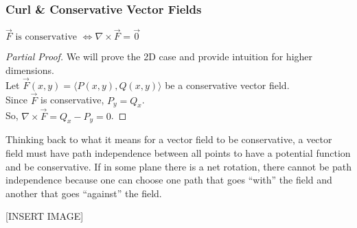 \subsubsection{Curl \& Conservative Vector Fields}
\begin{theorem}
	$\vec{F}\text{ is conservative }\Leftrightarrow\nabla\times\vec{F} = \vec{0}$
\end{theorem}
\begin{proof}[Partial Proof]
	We will prove the 2D case and provide intuition for higher dimensions.\\
	Let $\vec{F}(x,y) = \langle P(x,y), Q(x,y)\rangle$ be a conservative vector field.\\
	Since $\vec{F}$ is conservative, $P_y = Q_x$.\\
	So, $\nabla \times \vec{F}=Q_x-P_y=0$.
\end{proof}

\noindent
Thinking back to what it means for a vector field to be conservative, a vector field must have path independence between all points to have a potential function and be conservative. If in some plane there is a net rotation, there cannot be path independence because one can choose one path that goes “with” the field and another that goes “against” the field.

[INSERT IMAGE]